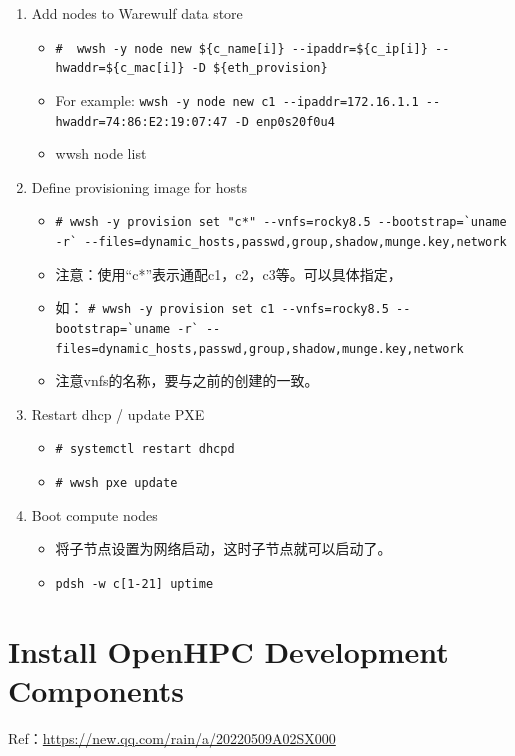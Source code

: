 {\begin{enumerate}
\item Add nodes to Warewulf data store
\begin{itemize}
\item {\tiny \verb|#  wwsh -y node new ${c_name[i]} --ipaddr=${c_ip[i]} --hwaddr=${c_mac[i]} -D ${eth_provision}|}
\item For example: {\tiny \verb|wwsh -y node new c1 --ipaddr=172.16.1.1 --hwaddr=74:86:E2:19:07:47 -D enp0s20f0u4| }
\item wwsh node list
\end{itemize}

\item Define provisioning image for hosts
\begin{itemize}
\item {\tiny \verb|# wwsh -y provision set "c*" --vnfs=rocky8.5 --bootstrap=`uname -r` --files=dynamic_hosts,passwd,group,shadow,munge.key,network|}
\item 注意：使用“c*”表示通配c1，c2，c3等。可以具体指定，
\item 如：
{\tiny \verb|# wwsh -y provision set c1 --vnfs=rocky8.5 --bootstrap=`uname -r` --files=dynamic_hosts,passwd,group,shadow,munge.key,network|}
\item 注意vnfs的名称，要与之前的创建的一致。
\end{itemize}

\item Restart dhcp / update PXE
\begin{itemize}
\item \verb|# systemctl restart dhcpd|
\item \verb|# wwsh pxe update|
\end{itemize}

\item Boot compute nodes
\begin{itemize}
\item 将子节点设置为网络启动，这时子节点就可以启动了。
\item \verb|pdsh -w c[1-21] uptime|
\end{itemize}
\end{enumerate}




\section{Install OpenHPC Development Components}
Ref：\url{https://new.qq.com/rain/a/20220509A02SX000}

}
